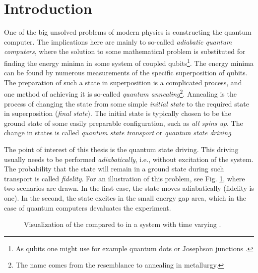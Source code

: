\chapter*{Introduction}
One of the big unsolved problems of modern physics is constructing the quantum computer. The implications here are mainly to so-called \emph{adiabatic quantum computers}, where the solution to some mathematical problem is substituted for finding the energy minima in some system of coupled qubits\footnote{As qubits one might use for example quantum dots \citep{dots} or Josephson junctions \citep{josephson}.}. The energy minima can be found by numerous measurements of the specific superposition of qubits. The preparation of such a state in superposition is a complicated process, and one method of achieving it is so-called \emph{quantum annealing}\footnote{The name comes from the resemblance to annealing in metallurgy.}. Annealing is the process of changing the state from some simple \emph{initial state} to the required state in superposition (\emph{final state}). The initial state is typically chosen to be the ground state of some easily preparable configuration, such as \emph{all spins up}. The change in states is called \emph{quantum state transport} or \emph{quantum state driving}.

The point of interest of this thesis is the quantum state driving. This driving usually needs to be performed \emph{adiabatically}, i.e., without excitation of the system. The probability that the state will remain in a ground state during such transport is called \emph{fidelity}. For an illustration of this problem, see Fig. \ref{fig:introDriving}, where two scenarios are drawn. In the first case, the state moves adiabatically (fidelity is one). In the second, the state excites in the small energy gap area, which in the case of quantum computers devaluates the experiment.

\begin{figure}[H]
    \centering
\caption{Visualization of the  compared to  in a system with time varying .}
    \label{fig:introDriving}
\end{figure}

